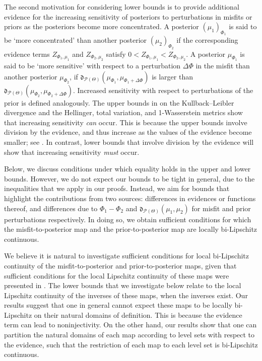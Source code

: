 \documentclass[a4paper]{scrartcl}
\theoremstyle{definition}
\numberwithin{equation}{section}
\begin{document}
The second motivation for considering lower bounds is to provide additional evidence for the increasing sensitivity of posteriors to perturbations in misfits or priors as the posteriors become more concentrated. 
A posterior $(\mu_1)_{\Phi_1}$ is said to be `more concentrated' than another posterior $(\mu_2)_{\Phi_2}$ if the corresponding evidence terms $Z_{\Phi_1,\mu_1}$ and $Z_{\Phi_2,\mu_2}$ satisfy $0<Z_{\Phi_1,\mu_1}<Z_{\Phi_2,\mu_2}$. 
A posterior $\mu_{\Phi_1}$ is said to be `more sensitive' with respect to a perturbation $\Delta \Phi$ in the misfit than another posterior $\mu_{\Phi_2}$, if $\mathfrak{d}_{\mathcal{P}(\Theta)}(\mu_{\Phi_1},\mu_{\Phi_1+\Delta \Phi})$ is larger than $\mathfrak{d}_{\mathcal{P}(\Theta)}(\mu_{\Phi_2},\mu_{\Phi_2+\Delta\Phi})$. Increased sensitivity with respect to perturbations of the prior is defined analogously.
The upper bounds in \cite{Sprungk2020} on the Kullback--Leibler divergence and the Hellinger, total variation, and 1-Wasserstein metrics show that increasing sensitivity \emph{can} occur. This is because the upper bounds involve division by the evidence, and thus increase as the values of the evidence become smaller; see \cite[Remark 9, Remark 18]{Sprungk2020}.
In contrast, lower bounds that involve division by the evidence will show that increasing sensitivity \emph{must} occur.

Below, we discuss conditions under which equality holds in the upper and lower bounds.
However, we do not expect our bounds to be tight in general, due to the inequalities that we apply in our proofs.
Instead, we aim for bounds that highlight the contributions from two sources: differences in evidences or functions thereof, and differences due to $\Phi_1-\Phi_2$ and $\mathfrak{d}_{\mathcal{P}(\Theta)}(\mu_1,\mu_2)$ for misfit and prior perturbations respectively.
In doing so, we obtain sufficient conditions for which the misfit-to-posterior map and the prior-to-posterior map are locally bi-Lipschitz continuous.

We believe it is natural to investigate sufficient conditions for local bi-Lipschitz continuity of the misfit-to-posterior and prior-to-posterior maps, given that sufficient conditions for the local Lipschitz continuity of these maps were presented in \cite{Sprungk2020}.
The lower bounds that we investigate below relate to the local Lipschitz continuity of the inverses of these maps, when the inverses exist.
Our results suggest that one in general cannot expect these maps to be locally bi-Lipschitz on their natural domains of definition.
This is because the evidence term can lead to noninjectivity.
On the other hand, our results show that one can partition the natural domains of each map according to level sets with respect to the evidence, such that the restriction of each map to each level set is bi-Lipschitz continuous.
\end{document}
